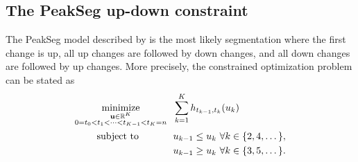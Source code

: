 \documentclass[aoas]{imsart}
\DeclareMathOperator*{\minimize}{minimize}
\newcommand{\RR}{\mathbb R}
\begin{document}
\subsection{The PeakSeg up-down constraint}
\label{sec:PeakSeg}

The PeakSeg model described by \citet{HOCKING-PeakSeg} is the most
likely segmentation where the first change is up, all up changes are
followed by down changes, and all down changes are followed by up
changes. More precisely, the constrained optimization problem can be
stated as
\begin{align}
  \label{eq:PeakSeg}
  \minimize_{
        \substack{\mathbf u\in\RR^K \\
    0=t_0<t_1<\cdots<t_{K-1}<t_K=n
}
    } &\ \ 
  \sum_{k=1}^K h_{t_{k-1}, t_k}(u_k)\\
      \text{subject to \hskip 0.9cm} &\ \ u_{k-1} \leq u_k\ \forall k\in\{2,4,\dots\},
  \nonumber\\
  &\ \ u_{k-1} \geq u_k\ \forall k\in\{3,5,\dots\}.
  \nonumber
\nonumber
\end{align}
\end{document}

